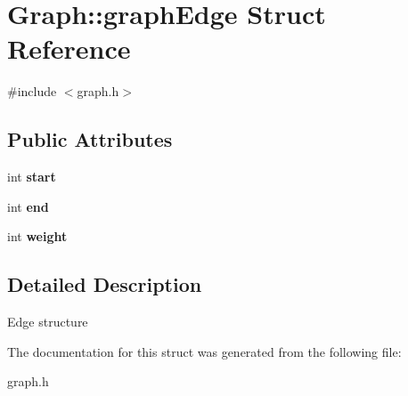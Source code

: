 \hypertarget{structGraph_1_1graphEdge}{}\section{Graph\+:\+:graph\+Edge Struct Reference}
\label{structGraph_1_1graphEdge}


{\ttfamily \#include $<$graph.\+h$>$}

\subsection*{Public Attributes}
\begin{DoxyCompactItemize}
\item 
\mbox{\label{structGraph_1_1graphEdge_a6cfa2349ec5a589ab726be2c72f8c30c}} 
int {\bfseries start}
\item 
\mbox{\label{structGraph_1_1graphEdge_a41a0164d6301666bd62461ba5979e484}} 
int {\bfseries end}
\item 
\mbox{\label{structGraph_1_1graphEdge_a9b2e1f8031291751aa41961994e11991}} 
int {\bfseries weight}
\end{DoxyCompactItemize}


\subsection{Detailed Description}
Edge structure 

The documentation for this struct was generated from the following file\+:\begin{DoxyCompactItemize}
\item 
graph.\+h\end{DoxyCompactItemize}
